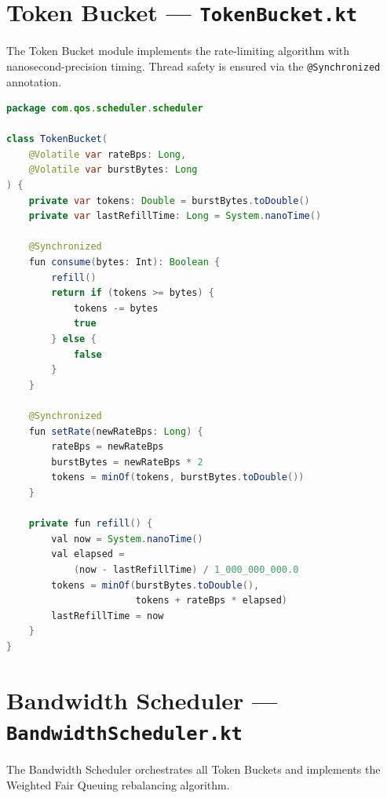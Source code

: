 
\section{Token Bucket --- \texttt{TokenBucket.kt}}
\label{app:tokenbucket}

The Token Bucket module implements the rate-limiting algorithm with nanosecond-precision timing. Thread safety is ensured via the \texttt{@Synchronized} annotation.

\begin{lstlisting}[language=Java, caption={TokenBucket.kt --- Complete rate limiter}, label={lst:tokenbucket}]
package com.qos.scheduler.scheduler

class TokenBucket(
    @Volatile var rateBps: Long,
    @Volatile var burstBytes: Long
) {
    private var tokens: Double = burstBytes.toDouble()
    private var lastRefillTime: Long = System.nanoTime()

    @Synchronized
    fun consume(bytes: Int): Boolean {
        refill()
        return if (tokens >= bytes) {
            tokens -= bytes
            true
        } else {
            false
        }
    }

    @Synchronized
    fun setRate(newRateBps: Long) {
        rateBps = newRateBps
        burstBytes = newRateBps * 2
        tokens = minOf(tokens, burstBytes.toDouble())
    }

    private fun refill() {
        val now = System.nanoTime()
        val elapsed =
            (now - lastRefillTime) / 1_000_000_000.0
        tokens = minOf(burstBytes.toDouble(),
                       tokens + rateBps * elapsed)
        lastRefillTime = now
    }
}
\end{lstlisting}


\section{Bandwidth Scheduler --- \texttt{BandwidthScheduler.kt}}
\label{app:scheduler}

The Bandwidth Scheduler orchestrates all Token Buckets and implements the Weighted Fair Queuing rebalancing algorithm.

